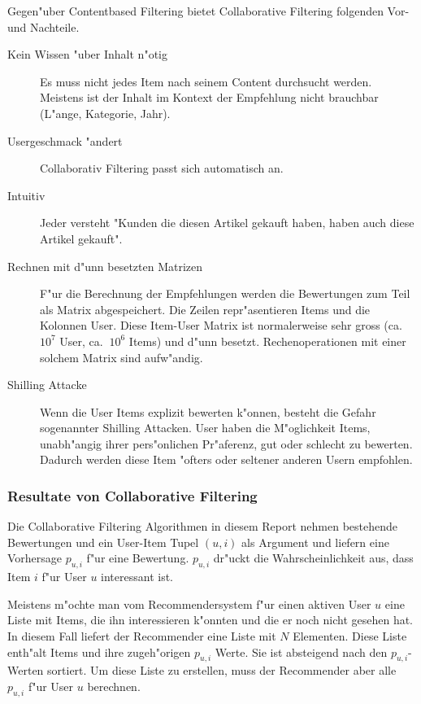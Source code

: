 \documentclass[a4paper, 12pt]{article}
\begin{document}
Gegen"uber Contentbased Filtering bietet Collaborative Filtering folgenden Vor- und Nachteile.
\begin{description}
\item[Vorteile]
\item
\begin{description}
\item[Kein Wissen "uber Inhalt n"otig] Es muss nicht jedes Item nach seinem Content durchsucht werden. Meistens ist der Inhalt im Kontext der Empfehlung nicht brauchbar (L"ange, Kategorie, Jahr).
\item[Usergeschmack "andert] Collaborativ Filtering passt sich automatisch an.
\item[Intuitiv] Jeder versteht "Kunden die diesen Artikel gekauft haben, haben auch diese Artikel gekauft".
\end{description}
\item[Nachteile]
\item
\begin{description}
\item[Rechnen mit d"unn besetzten Matrizen] F"ur die Berechnung der Empfehlungen werden die Bewertungen zum Teil als Matrix abgespeichert. Die Zeilen repr"asentieren Items und die Kolonnen User. Diese Item-User Matrix ist normalerweise sehr gross (ca. $10^{7}$ User, ca. $~10^6$ Items) und d"unn besetzt. Rechenoperationen mit einer solchem Matrix sind aufw"andig.
\item[Shilling Attacke] Wenn die User Items explizit bewerten k"onnen, besteht die Gefahr sogenannter Shilling Attacken. User haben die M"oglichkeit Items, unabh"angig ihrer pers"onlichen Pr"aferenz, gut oder schlecht zu bewerten. Dadurch werden diese Item "ofters oder seltener anderen Usern empfohlen.
\end{description}
\end{description}

\subsubsection{Resultate von Collaborative Filtering}
\label{sec:output}

Die Collaborative Filtering Algorithmen in diesem Report nehmen bestehende Bewertungen und ein User-Item Tupel $(u,i)$ als Argument und liefern eine Vorhersage $p_{u,i}$ f"ur eine Bewertung.  $p_{u,i}$ dr"uckt die Wahrscheinlichkeit aus, dass Item $i$ f"ur User $u$ interessant ist.

Meistens m"ochte man vom Recommendersystem f"ur einen aktiven User $u$ eine Liste mit Items, die ihn interessieren k"onnten und die er noch nicht gesehen hat. In diesem Fall liefert der Recommender eine Liste mit $N$ Elementen. Diese Liste enth"alt Items und ihre zugeh"origen $p_{u,i}$ Werte. Sie ist absteigend nach den $p_{u,i}$-Werten sortiert. Um diese Liste zu erstellen, muss der Recommender aber alle $p_{u,i}$ f"ur User $u$ berechnen.
\end{document}
